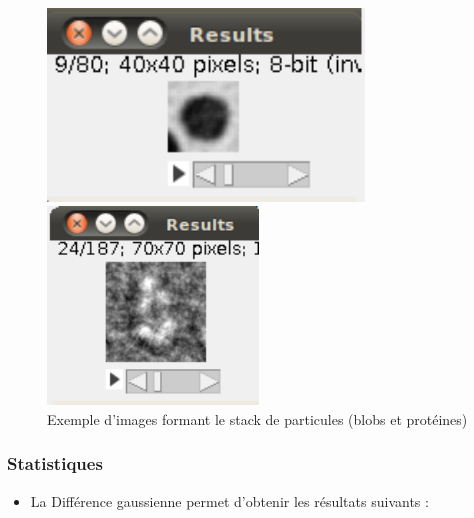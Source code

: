 \begin{figure}[!ht]
\begin{center}
 \begin{minipage}{.450\linewidth}
  \includegraphics[width=0.75\textwidth]{cropblob.png}  
 \end{minipage} \hfill
\begin{minipage}{.450\linewidth}
  \includegraphics[width=0.5\textwidth]{cropprotDog.png}   
 \end{minipage} \hfill
\caption{Exemple d'images formant le stack de particules (blobs et protéines)}
\end{center}
\end{figure}

\subsubsection*{Statistiques}

\begin{itemize}
\item La Différence gaussienne permet d'obtenir les résultats suivants :
\end{itemize}


